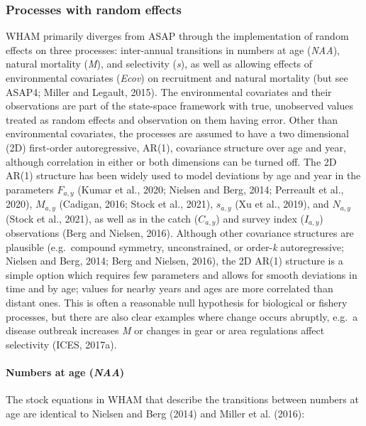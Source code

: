 \documentclass[]{article}
\let\oldparagraph\paragraph
\renewcommand{\paragraph}[1]{\oldparagraph{#1}\mbox{}}
\begin{document}
\hypertarget{processes-with-random-effects}{%
\subsubsection{Processes with random
effects}\label{processes-with-random-effects}}

WHAM primarily diverges from ASAP through the implementation of random
effects on three processes: inter-annual transitions in numbers at age
(\emph{NAA}), natural mortality (\emph{M}), and selectivity (\emph{s}),
as well as allowing effects of environmental covariates (\emph{Ecov}) on
recruitment and natural mortality (but see ASAP4; Miller and Legault,
2015). The environmental covariates and their observations are part of
the state-space framework with true, unobserved values treated as random
effects and observation on them having error. Other than environmental
covariates, the processes are assumed to have a two dimensional (2D)
first-order autoregressive, AR(1), covariance structure over age and
year, although correlation in either or both dimensions can be turned
off. The 2D AR(1) structure has been widely used to model deviations by
age and year in the parameters \(F_{a,y}\) (Kumar et al., 2020; Nielsen
and Berg, 2014; Perreault et al., 2020), \(M_{a,y}\) (Cadigan, 2016;
Stock et al., 2021), \(s_{a,y}\) (Xu et al., 2019), and \(N_{a,y}\)
(Stock et al., 2021), as well as in the catch (\(C_{a,y}\)) and survey
index (\(I_{a,y}\)) observations (Berg and Nielsen, 2016). Although
other covariance structures are plausible (e.g.~compound symmetry,
unconstrained, or order-\emph{k} autoregressive; Nielsen and Berg, 2014;
Berg and Nielsen, 2016), the 2D AR(1) structure is a simple option which
requires few parameters and allows for smooth deviations in time and by
age; values for nearby years and ages are more correlated than distant
ones. This is often a reasonable null hypothesis for biological or
fishery processes, but there are also clear examples where change occurs
abruptly, e.g.~a disease outbreak increases \emph{M} or changes in gear
or area regulations affect selectivity (ICES, 2017a).

\hypertarget{numbers-at-age-naa}{%
\paragraph{\texorpdfstring{Numbers at age
(\emph{NAA})}{Numbers at age (NAA)}}\label{numbers-at-age-naa}}

The stock equations in WHAM that describe the transitions between
numbers at age are identical to Nielsen and Berg (2014) and Miller et
al. (2016):
\end{document}

